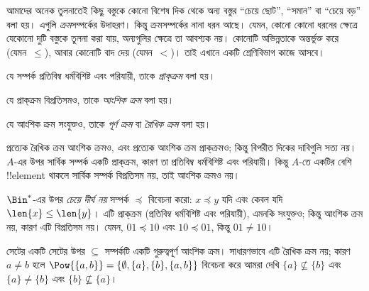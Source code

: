 \documentclass[../../../include/open-logic-section]{subfiles}
\begin{document}

\begin{explain}
আমাদের অনেক তুলনাতেই কিছু বস্তুকে কোনো বিশেষ দিক থেকে অন্য বস্তুর ``চেয়ে ছোট'', ``সমান'' বা ``চেয়ে বড়'' বলা হয়। এগুলি \emph{ক্রম}সম্পর্কের উদাহরণ। কিন্তু ক্রমসম্পর্কের নানা ধরন আছে। যেমন, কোনো কোনো ধরনের ক্ষেত্রে যেকোনো দুটি বস্তুকে তুলনা করা যায়, অন্যগুলির ক্ষেত্রে তা আবশ্যক নয়। কোনোটি অভিন্নতাকে অন্তর্ভুক্ত করে (যেমন~$\le$), আবার কোনোটি বাদ দেয় (যেমন~$<$)। তাই এখানে একটি শ্রেণিবিভাগ কাজে আসবে।
\end{explain}

\begin{defn}[প্রাক্‌ক্রম]
যে সম্পর্ক প্রতিবিম্ব ধর্মবিশিষ্ট এবং পরিযায়ী, তাকে \emph{প্রাক্‌ক্রম} বলা হয়।
\end{defn}

\begin{defn}[আংশিক ক্রম]
যে প্রাক্‌ক্রম বিপ্রতিসমও, তাকে \emph{আংশিক ক্রম} বলা হয়।
\end{defn}

\begin{defn}[রৈখিক ক্রম]
যে আংশিক ক্রম সংযুক্তও, তাকে \emph{পূর্ণ ক্রম} বা \emph{রৈখিক ক্রম} বলা হয়।
\end{defn}

\begin{ex}
প্রত্যেক রৈখিক ক্রম আংশিক ক্রমও, এবং প্রত্যেক আংশিক ক্রম প্রাক্‌ক্রমও; কিন্তু বিপরীত দিকের দাবিগুলি সত্য নয়। $A$-এর উপর সার্বিক সম্পর্ক একটি প্রাক্‌ক্রম, কারণ তা প্রতিবিম্ব ধর্মবিশিষ্ট এবং পরিযায়ী। কিন্তু $A$-তে একটির বেশি !!{element} থাকলে সার্বিক সম্পর্ক বিপ্রতিসম নয়, তাই আংশিক ক্রমও নয়।
\end{ex}

\begin{ex}
$\Bin^*$-এর উপর \emph{চেয়ে দীর্ঘ নয়} সম্পর্ক $\preccurlyeq$ বিবেচনা করো: $x \preccurlyeq y$ যদি এবং কেবল যদি $\len{x} \le \len{y}$। এটি প্রাক্‌ক্রম (প্রতিবিম্ব ধর্মবিশিষ্ট এবং পরিযায়ী), এমনকি সংযুক্তও; কিন্তু আংশিক ক্রম নয়, কারণ এটি বিপ্রতিসম নয়। যেমন, $01 \preccurlyeq 10$ এবং $10 \preccurlyeq 01$, কিন্তু $01 \neq 10$।
\end{ex}

\begin{ex}
সেটের একটি সেটের উপর $\subseteq$ সম্পর্কটি একটি গুরুত্বপূর্ণ আংশিক ক্রম। সাধারণভাবে এটি রৈখিক ক্রম নয়; কারণ $a \neq b$ হলে $\Pow{\{a, b\}} = \{\emptyset, \{a\}, \{b\}, \{a,b\}\}$ বিবেচনা করে আমরা দেখি $\{a\} \nsubseteq \{b\}$ এবং $\{a\} \neq \{b\}$ এবং $\{b\} \nsubseteq \{a\}$।
\end{ex}
\end{document}
